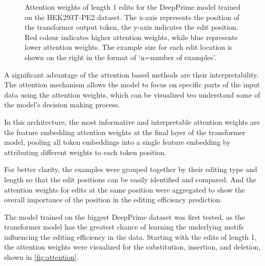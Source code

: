 \begin{figure}
    \centering
    \caption[Attention weights for the DeepPrime model trained on the HEK293T-PE2 dataset]{Attention weights of length 1 edits for the DeepPrime model trained on the HEK293T-PE2 dataset. The x-axis represents the position of the transformer output token, the y-axis indicates the edit position. Red colour indicates higher attention weights, while blue represents lower attention weights. The example size for each edit location is shown on the right in the format of `n=number of examples'.}
    \label{fig:attention}
\end{figure}

A significant advantage of the attention based methods are their interpretability. The attention mechanism allows the model to focus on specific parts of the input data using the attention weights, which can be visualized teo understand some of the model's decision making process. 

In this architecture, the most informative and interpretable attention weights are the feature embedding attention weights at the final layer of the transformer model, pooling all token embeddings into a single feature embedding by attributing different weights to each token position. 

For better clarity, the examples were grouped together by their editing type and length so that the edit positions can be easily identified and compared. And the attention weights for edits at the same position were aggregated to show the overall importance of the position in the editing efficiency prediction.

The model trained on the biggest DeepPrime dataset was first tested, as the transformer model has the greatest chance of learning the underlying motifs influencing the editing efficiency in the data. Starting with the edits of length 1, the attention weights were visualized for the substitution, insertion, and deletion, shown in \autoref{fig:attention}. 

